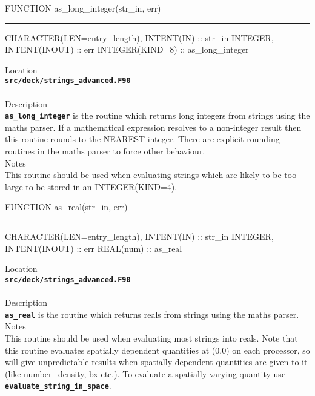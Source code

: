 \documentclass[12pt,a4paper]{article}
\newcommand{\HRule}{\rule[0.3cm]{\linewidth}{0.5mm}}
\newcommand{\inlinecode}[1]{{\color{warwickred} \bf\texttt{#1}}}
\begin{document}
\pagebreak
\begin{codedef}
FUNCTION as_long_integer(str_in, err)
\HRule
CHARACTER(LEN=entry_length), INTENT(IN) :: str_in
INTEGER, INTENT(INOUT) :: err
INTEGER(KIND=8) :: as_long_integer
\end{codedef}
\vspace{1cm}
{\Large Location\\}
\inlinecode{src/deck/strings\_advanced.F90}\\
\\[0.5cm]
{\Large Description\\}
\inlinecode{as\_long\_integer} is the routine which returns long integers from
strings using the maths parser. If a mathematical expression resolves to a
non-integer result then this routine rounds to the NEAREST integer. There are
explicit rounding routines in the maths parser to force other behaviour.
\\[0.5cm]
{\Large Notes\\}
This routine should be used when evaluating strings which are likely to be too
large to be stored in an INTEGER(KIND=4).

\pagebreak
\begin{codedef}
FUNCTION as_real(str_in, err)
\HRule
CHARACTER(LEN=entry_length), INTENT(IN) :: str_in
INTEGER, INTENT(INOUT) :: err
REAL(num) :: as_real
\end{codedef}
\vspace{1cm}
{\Large Location\\}
\inlinecode{src/deck/strings\_advanced.F90}\\
\\[0.5cm]
{\Large Description\\}
\inlinecode{as\_real} is the routine which returns reals from strings using the
maths parser.
\\[0.5cm]
{\Large Notes\\}
This routine should be used when evaluating most strings into reals. Note that
this routine evaluates spatially dependent quantities at (0,0) on each
processor, so will give unpredictable results when spatially dependent
quantities are given to it (like number\_density, bx etc.). To evaluate a spatially varying
quantity use \inlinecode{evaluate\_string\_in\_space}.
\end{document}
